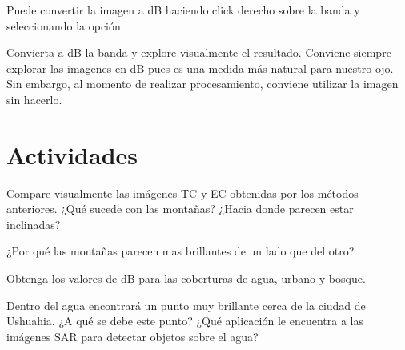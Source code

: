 Puede convertir la imagen a dB haciendo click derecho sobre la banda y seleccionando la opción .

Convierta a dB la banda  y explore visualmente el resultado. Conviene siempre explorar las imagenes en dB pues es una medida más natural para nuestro ojo. Sin embargo, al momento de realizar procesamiento, conviene utilizar la imagen sin hacerlo. %

\section{Actividades}

\begin{que}
    Compare visualmente las imágenes TC y EC obtenidas por los métodos anteriores. ¿Qué sucede con las montañas? ¿Hacia donde parecen estar inclinadas?
\end{que}

\begin{que}
    ¿Por qué las montañas parecen mas brillantes de un lado que del otro?
\end{que}

\begin{que}
    Obtenga los valores de dB para las coberturas de agua, urbano y bosque.
\end{que}

\begin{que}
    Dentro del agua encontrará un punto muy brillante cerca de la ciudad de Ushuahia. ¿A qué se debe este punto? ¿Qué aplicación le encuentra a las imágenes SAR para detectar objetos sobre el agua?
\end{que}
